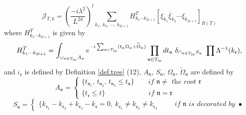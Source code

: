 \begin{lem}
\begin{equation}\label{eq.coefterm}
\mathcal{J}_{T,k}=\left(\frac{-i\lambda^2}{L^{2d}}\right)^l\sum_{k_1,\, k_2,\, \cdots,\, k_{2l+1}} H^T_{k_1\cdots k_{2l+1}}  [\xi_{k_1}\bar{\xi}_{k_2}\cdots\xi_{k_{2l+1}}]_{R(T)}    
\end{equation}
where $H^T_{k_1\cdots k_{2l+1}}$ is given by
\begin{equation}\label{eq.coef}
H^T_{k_1\cdots k_{2l+1}}=\int_{\cup_{\mathfrak{n}\in T_{\text{in}}} A_{\mathfrak{n}}} e^{-i\sum_{\mathfrak{n}\in T_{\text{in}}} %
(t_{\mathfrak{n}}\Omega_{\mathfrak{n}}+\widetilde{\Omega}_{\mathfrak{n}})} \prod_{\mathfrak{n}\in T_{\text{in}}} dt_{\mathfrak{n}} %
\ \delta_{\cap_{\mathfrak{n}\in T_{\text{in}}} S_{\mathfrak{n}}}\ \prod_{%
}\Lambda^{-1}(k_{\mathfrak{e}}) ,
\end{equation}
and $ \iota_{\mathfrak{e}}$ is defined by Definition \ref{def.tree} (12), $A_{\mathfrak{n}}$, $S_{\mathfrak{n}}$, $\Omega_{\mathfrak{n}}$, $\widetilde{\Omega}_{\mathfrak{n}}$ are defined by 
\begin{equation}
    A_{\mathfrak{n}}=
        \begin{cases}
            \{t_{\mathfrak{n}_1},\, t_{\mathfrak{n}_2},\, t_{\mathfrak{n}_3}\le t_{\mathfrak{n}}\} \qquad \textit{if }\mathfrak{n}\ne\textit{ the root }\mathfrak{r}
            \\
            \{t_{\mathfrak{r}}\le t\} \qquad\qquad\qquad\  \textit{if }\mathfrak{n}= \mathfrak{r}
        \end{cases}
\end{equation}
\begin{equation}
    S_{\mathfrak{n}}=
        \begin{cases}
            \{k_{\mathfrak{e}_1}-k_{\mathfrak{e}_2}+k_{\mathfrak{e}_3}-k_{\mathfrak{e}}=0,\ k_{\mathfrak{e}_1}\ne k_{\mathfrak{e}_2}\ne k_{\mathfrak{e}_3} \qquad \ \  \textit{if }\mathfrak{n}\textit{ is decorated by }\bullet

\end{cases}
\end{equation}
\end{lem}
